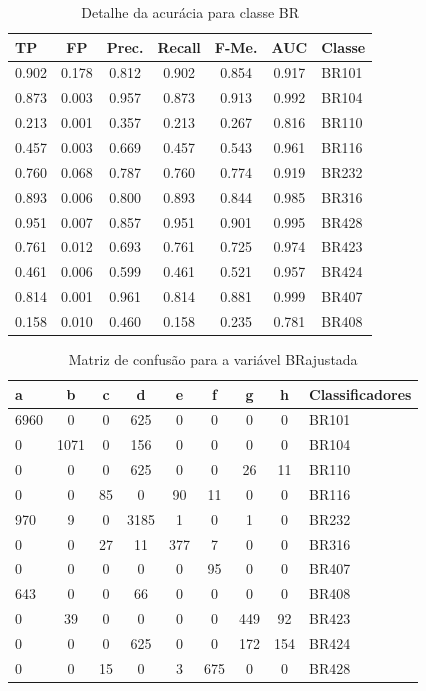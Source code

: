 \begin{enumerate}
	\begin{table}[!ht]
		\centering
		\caption{Detalhe da acurácia para classe BR}
		\vspace{1mm}
		\begin{tabular}{l|c|c|c|c|c|l}
			\hline
			\textbf{TP} & \textbf{FP} & \textbf{Prec.} & \textbf{Recall} & \textbf{F-Me.} & \textbf{AUC} & \textbf{Classe} \\
			\hline
			0.902 & 0.178 & 0.812 & 0.902 & 0.854 & 0.917 & BR101 \\
			0.873 & 0.003 & 0.957 & 0.873 & 0.913 & 0.992 & BR104 \\
			0.213 & 0.001 & 0.357 & 0.213 & 0.267 & 0.816 & BR110 \\
			0.457 & 0.003 & 0.669 & 0.457 & 0.543 & 0.961 & BR116 \\
			0.760 & 0.068 & 0.787 & 0.760 & 0.774 & 0.919 & BR232 \\
			0.893 & 0.006 & 0.800 & 0.893 & 0.844 & 0.985 & BR316 \\
			0.951 & 0.007 & 0.857 & 0.951 & 0.901 & 0.995 & BR428 \\
			0.761 & 0.012 & 0.693 & 0.761 & 0.725 & 0.974 & BR423 \\
			0.461 &	0.006 &	0.599 & 0.461 &	0.521 & 0.957 & BR424 \\
			0.814 & 0.001 & 0.961 & 0.814 & 0.881 & 0.999 & BR407 \\
			0.158 & 0.010 & 0.460 & 0.158 & 0.235 & 0.781 & BR408 \\
		\end{tabular}
	\end{table}
	
	\begin{table}[!ht]
		\centering
		\caption{Matriz de confusão para a variável BRajustada}
		\vspace{1mm}
		\begin{tabular}{l|c|c|c|c|c|c|c|l}
			\hline
			\textbf{a} & \textbf{b} & \textbf{c} & \textbf{d} & \textbf{e} & \textbf{f} & \textbf{g} & \textbf{h} & \textbf{Classificadores}\\
			\hline
			6960 & 0 & 0 & 625 & 0 & 0 & 0 & 0 & BR101 \\
			0 & 1071 & 0 & 156 & 0 & 0 & 0 & 0  & BR104 \\
			0 & 0 & 0 & 625 & 0 & 0 & 26 & 11  & BR110 \\
			0 & 0 & 85 & 0 & 90 & 11 & 0 & 0  & BR116 \\
			970 & 9 & 0 & 3185 & 1 & 0 & 1 & 0  & BR232 \\
			0 & 0 & 27 & 11 & 377 & 7 & 0 & 0  & BR316 \\
			0 & 0 & 0 & 0 & 0 & 95 & 0 & 0  & BR407 \\
			643 & 0 & 0 & 66 & 0 & 0 & 0 & 0  & BR408 \\
			0 & 39 & 0 & 0 & 0 & 0 & 449 & 92  & BR423 \\
			0 & 0 & 0 & 625 & 0 & 0 & 172 & 154  & BR424 \\
			0 & 0 & 15 & 0 & 3 & 675 & 0 & 0  & BR428 \\			
		\end{tabular}
	\end{table}	

\end{enumerate}

